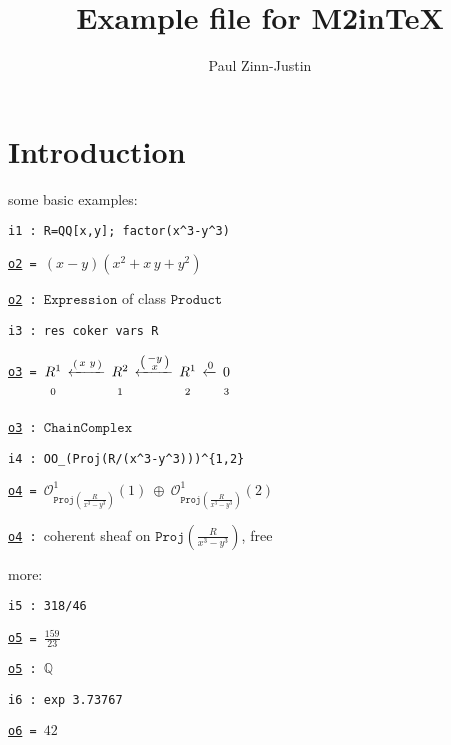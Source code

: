 \documentclass[12pt,a4paper]{amsart}
\title{Example file for M2inTeX}
\author{Paul Zinn-Justin}
\begin{document}
\maketitle

\section{Introduction}
some basic examples:
\smallskip
\begin{verbatim}
i1 : R=QQ[x,y]; factor(x^3-y^3)
\end{verbatim}
\noindent\underline{\tt o2}\verb| = |$\left(x-y\right)\left(x^{2}+x\,y+y^{2}\right)$

\noindent\underline{\tt o2}\verb| : |$\texttt{Expression}$ of class $\texttt{Product}$
\begin{verbatim}
i3 : res coker vars R
\end{verbatim}
\noindent\underline{\tt o3}\verb| = |$\underset{\vphantom{\Big|}0}{R^{1}}\,\xleftarrow{\left(\begin{smallmatrix}
x&y\\
\end{smallmatrix}\right)}\,\underset{\vphantom{\Big|}1}{R^{2}}\,\xleftarrow{\left(\begin{smallmatrix}
-y\\
x\\
\end{smallmatrix}\right)}\,\underset{\vphantom{\Big|}2}{R^{1}}\,\xleftarrow{0}\,\underset{\vphantom{\Big|}3}{0}$

\noindent\underline{\tt o3}\verb| : |$\texttt{ChainComplex}$
\begin{verbatim}
i4 : OO_(Proj(R/(x^3-y^3)))^{1,2}
\end{verbatim}
\noindent\underline{\tt o4}\verb| = |${\mathcal O}_{\texttt{Proj}\left(\frac{R}{x^{3}-y^{3}}\right)}^{1}\left(1\right)\ \oplus \ {\mathcal O}_{\texttt{Proj}\left(\frac{R}{x^{3}-y^{3}}\right)}^{1}\left(2\right)$

\noindent\underline{\tt o4}\verb| : |coherent sheaf on $\texttt{Proj}\left(\frac{R}{x^{3}-y^{3}}\right)$, free
\smallskip

more:
\smallskip
\begin{verbatim}
i5 : 318/46
\end{verbatim}
\noindent\underline{\tt o5}\verb| = |$\frac{159}{23}$

\noindent\underline{\tt o5}\verb| : |${\mathbb Q}$
\begin{verbatim}
i6 : exp 3.73767
\end{verbatim}
\noindent\underline{\tt o6}\verb| = |${42}$
\end{document}
